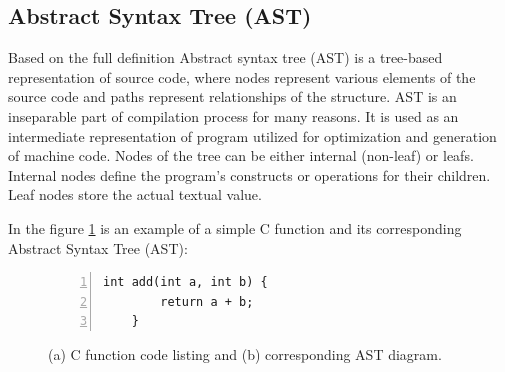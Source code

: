 \documentclass[conference]{IEEEtran}
\begin{document}
\subsection{Abstract Syntax Tree (AST)}

\quad Based on the full definition \cite{sun_ast} Abstract syntax tree (AST) is a tree-based representation of source code, where nodes represent various elements of the source code 
and paths represent relationships of the structure. AST is an inseparable part of compilation process for many reasons. It is used as an 
intermediate representation of program utilized for optimization and generation of machine code. Nodes of the tree can be either internal 
(non-leaf) or leafs. Internal nodes define the program's constructs or operations for their children. Leaf nodes store the actual textual value. 

In the figure \ref{fig:ast_struc_example} is an example of a simple C function and its corresponding Abstract Syntax Tree (AST):

\begin{figure}[!t]
    \centering
    \begin{minipage}{\columnwidth}
    \begin{lstlisting}[caption={Simple C function for addition}, label={lst:add}, basicstyle=\footnotesize\ttfamily, frame=single, numbers=left]
    int add(int a, int b) {
        return a + b;
    }
    \end{lstlisting}
    \end{minipage}
    
    \vspace{1em} %
    
    \caption{(a) C function code listing and (b) corresponding AST diagram.}
    \label{fig:ast_struc_example}
\end{figure}
\end{document}
